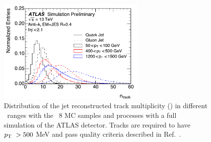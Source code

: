 \begin{figure}[htb]
 \centering
\includegraphics[width=0.65\textwidth]{fig/tagging/fig_01_ATL-PHYS-PUB-2017-009.pdf}
\caption{Distribution of the jet reconstructed track multiplicity (\ntrk ) in
 different \pt\ ranges with the \pythia~8 MC samples and processes with a full simulation of the
 ATLAS detector. Tracks are required to have $p_{\mathrm{T}}~> 500$ MeV and pass
  quality criteria described in Ref.~\cite{ATL-PHYS-PUB-2017-009}. }
\label{fig:jet_pt_quark_gluon}
\end{figure}

